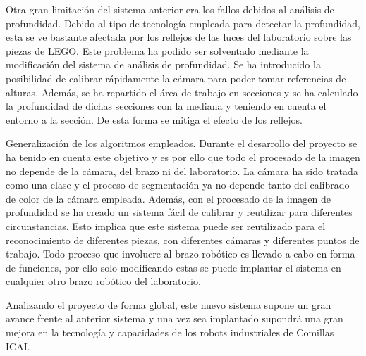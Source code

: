 {Otra gran limitación del sistema anterior era los fallos debidos al análisis de profundidad. Debido al tipo de tecnología empleada para detectar la profundidad, esta se ve bastante afectada por los reflejos de las luces del laboratorio sobre las piezas de LEGO. Este problema ha podido ser solventado mediante la modificación del sistema de análisis de profundidad. Se ha introducido la posibilidad de calibrar rápidamente la cámara para poder tomar referencias de alturas. Además, se ha repartido el área de trabajo en secciones y se ha calculado la profundidad de dichas secciones con la mediana y teniendo en cuenta el entorno a la sección. De esta forma se mitiga el efecto de los reflejos.

Generalización de los algoritmos empleados. Durante el desarrollo del proyecto se ha tenido en cuenta este objetivo y es por ello que todo el procesado de la imagen no depende de la cámara, del brazo ni del laboratorio. La cámara ha sido tratada como una clase y el proceso de segmentación ya no depende tanto del calibrado de color de la cámara empleada. Además, con el procesado de la imagen de profundidad se ha creado un sistema fácil de calibrar y reutilizar para diferentes circunstancias. Esto implica que este sistema puede ser reutilizado para el reconocimiento de diferentes piezas, con diferentes cámaras y diferentes puntos de trabajo. Todo proceso que involucre al brazo robótico es llevado a cabo en forma de funciones, por ello solo modificando estas se puede implantar el sistema en cualquier otro brazo robótico del laboratorio.

Analizando el proyecto de forma global, este nuevo sistema supone un gran avance frente al anterior sistema y una vez sea implantado supondrá una gran mejora en la tecnología y capacidades de los robots industriales de Comillas ICAI.
}